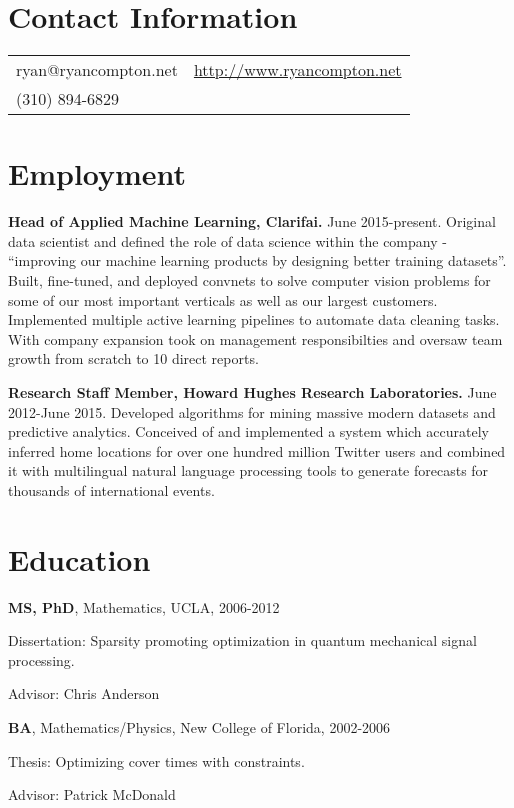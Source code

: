 \documentclass[margin,line]{res}
\newenvironment{list1}{
  \begin{list}{\ding{113}}{%
      \setlength{\itemsep}{0in}
      \setlength{\parsep}{0in} \setlength{\parskip}{0in}
      \setlength{\topsep}{0in} \setlength{\partopsep}{0in} 
      \setlength{\leftmargin}{0.17in}}}{\end{list}}
\begin{document}

\begin{resume}
\section{\sc Contact Information}
\vspace{.05in}
\begin{tabular}{@{}p{2in}p{4in}}
    ryan@ryancompton.net   &  \url{http://www.ryancompton.net} \\         
(310) 894-6829 & \\
\end{tabular}

\section{\sc Employment}
    {\bf Head of Applied Machine Learning, Clarifai.} June 2015-present. Original data scientist and defined the role of data science within the company - ``improving our machine learning products by designing better training datasets''. Built, fine-tuned, and deployed convnets to solve computer vision problems for some of our most important verticals as well as our largest customers. Implemented multiple active learning pipelines to automate data cleaning tasks. With company expansion took on management responsibilties and oversaw team growth from scratch to 10 direct reports.   
    
    {\bf Research Staff Member, Howard Hughes Research Laboratories.} June 2012-June 2015. Developed algorithms for mining massive modern datasets and predictive analytics. Conceived of and implemented a system which accurately inferred home locations for over one hundred million Twitter users and combined it with multilingual natural language processing tools to generate forecasts for thousands of international events.

\section{\sc Education}
    {\bf MS, PhD}, Mathematics, UCLA, 2006-2012\\
\vspace*{-.1in}
\begin{list1}
\item [] Dissertation: Sparsity promoting optimization in quantum mechanical signal processing.
\item [] Advisor: Chris Anderson
\end{list1}
    {\bf BA}, Mathematics/Physics, New College of Florida, 2002-2006\\
\vspace*{-.1in}
\begin{list1}
\item [] Thesis: Optimizing cover times with constraints.
\item [] Advisor: Patrick McDonald
\end{list1}


\end{resume}
\end{document}
